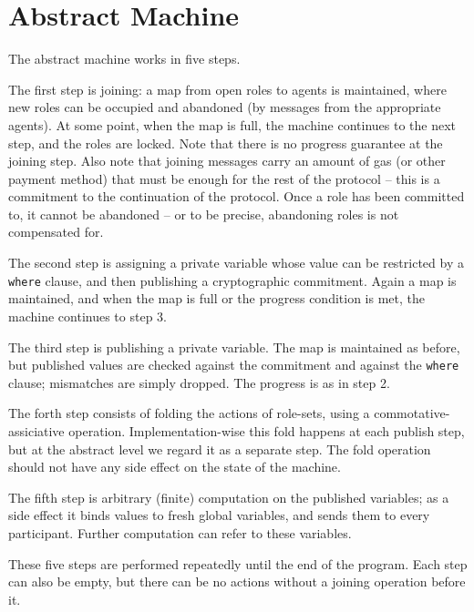 \documentclass[acmsmall,review,anonymous]{acmart}\settopmatter{printfolios=true}
\begin{document}




\maketitle

\section{Abstract Machine}
The abstract machine works in five steps.

The first step is joining: a map from open roles to agents is maintained, where new roles can be occupied and abandoned (by messages from the appropriate agents). At some point, when the map is full, the machine continues to the next step, and the roles are locked. Note that there is no progress guarantee at the joining step. Also note that joining messages carry an amount of gas (or other payment method) that must be enough for the rest of the protocol -- this is a commitment to the continuation of the protocol. Once a role has been committed to, it cannot be abandoned -- or to be precise, abandoning roles is not compensated for.

The second step is assigning a private variable whose value can be restricted by a \texttt{where} clause, and then publishing a cryptographic commitment. Again a map is maintained, and when the map is full or the progress condition is met, the machine continues to step 3.

The third step is publishing a private variable. The map is maintained as before, but published values are checked against the commitment and against the \texttt{where} clause; mismatches are simply dropped. The progress is as in step 2.

The forth step consists of folding the actions of role-sets, using a commotative-assiciative operation. Implementation-wise this fold happens at each publish step, but at the abstract level we regard it as a separate step. The fold operation should not have any side effect on the state of the machine.

The fifth step is arbitrary (finite) computation on the published variables; as a side effect it binds values to fresh global variables, and sends them to every participant. Further computation can refer to these variables.

These five steps are performed repeatedly until the end of the program. Each step can also be empty, but there can be no actions without a joining operation before it.
\end{document}
